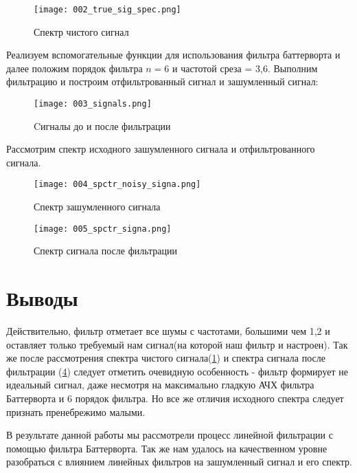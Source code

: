 \begin{figure}[H]
	\begin{center}
		\texttt{[image: 002\_true\_sig\_spec.png]}
		\caption{Спектр чистого сигнал} 
		\label{pic:pic02} %
	\end{center}
\end{figure} 

Реализуем вспомогательные функции для использования фильтра баттерворта и далее положим порядок фильтра $n = 6$ и частотой среза = 3,6. Выполним фильтрацию и построим отфильтрованный сигнал и зашумленный сигнал:

\begin{figure}[H]
	\begin{center}
		\texttt{[image: 003\_signals.png]}
		\caption{Cигналы до и после фильтрации} 
		\label{pic:pic03} %
	\end{center}
\end{figure} 

Рассмотрим спектр исходного зашумленного сигнала и отфильтрованного сигнала.

\begin{figure}[H]
	\begin{center}
		\texttt{[image: 004\_spctr\_noisy\_signa.png]}
		\caption{Спектр зашумленного сигнала } 
		\label{pic:pic04} %
	\end{center}
\end{figure} 

\begin{figure}[H]
	\begin{center}
		\texttt{[image: 005\_spctr\_signa.png]}
		\caption{Спектр сигнала после фильтрации} 
		\label{pic:pic05} %
	\end{center}
\end{figure} 

\parindent=1cm %


\section{Выводы}
Действительно, фильтр отметает все шумы с частотами, большими чем 1,2 и оставляет только требуемый нам сигнал(на которой наш фильтр и настроен). Так же после рассмотрения спектра чистого сигнала(\ref{pic:pic02}) и спектра сигнала после фильтрации (\ref{pic:pic05}) следует отметить
очевидную особенность - фильтр формирует не идеальный сигнал, даже несмотря на максимально гладкую АЧХ фильтра Баттерворта и 6 порядок фильтра. Но все же отличия исходного спектра следует признать пренебрежимо малыми.
  
В результате данной работы мы рассмотрели процесс линейной фильтрации с помощью фильтра Баттерворта. 
Так же нам удалось на качественном уровне разобраться с влиянием линейных фильтров на зашумленный сигнал и его спектр.



